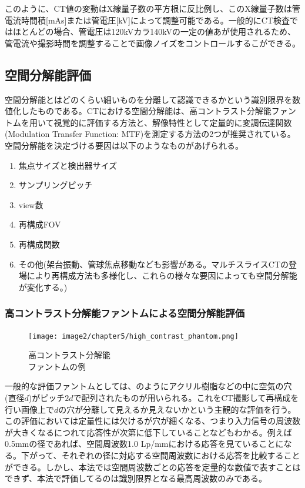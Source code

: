 このように、CT値の変動はX線量子数の平方根に反比例し、このX線量子数は管電流時間積[mAs]または管電圧[kV]によって調整可能である。一般的にCT検査ではほとんどの場合、管電圧は120kVカラ140kVの一定の値あが使用されるため、管電流や撮影時間を調整することで画像ノイズをコントロールするこができる。
\fi


\subsection{空間分解能評価}
空間分解能とはどのくらい細いものを分離して認識できるかという識別限界を数値化したものである。CTにおける空間分解能は、高コントラスト分解能ファントムを用いて視覚的に評価する方法と、解像特性として定量的に変調伝達関数(Modulation Transfer Function: MTF)を測定する方法の2つが推奨されている。空間分解能を決定づける要因は以下のようなものがあげられる。
\begin{enumerate}
\item 焦点サイズと検出器サイズ
\item サンプリングピッチ
\item view数
\item 再構成FOV
\item 再構成関数
\item その他(架台振動、管球焦点移動なども影響がある。マルチスライスCTの登場により再構成方法も多様化し、これらの様々な要因によっても空間分解能が変化する。)
\end{enumerate}

\subsubsection*{高コントラスト分解能ファントムによる空間分解能評価}

\begin{figure}
 \begin{center}
 \texttt{[image: image2/chapter5/high\_contrast\_phantom.png]} 
 \end{center}
 \caption{高コントラスト分解能\\ファントムの例}
 \label{fig:high_contrast_phantom}
\end{figure}
一般的な評価ファントムとしては、のようにアクリル樹脂などの中に空気の穴(直径$d$)がピッチ$2d$で配列されたものが用いられる。これをCT撮影して再構成を行い画像上で$d$の穴が分離して見えるか見えないかという主観的な評価を行う。この評価においては定量性には欠けるが穴が細くなる、つまり入力信号の周波数が大きくなるにつれて応答性が次第に低下していることなどもわかる。例えば0.5mmの径であれば、空間周波数1.0 Lp/mmにおける応答を見ていることになる。下がって、それぞれの径に対応する空間周波数における応答を比較することができる。しかし、本法では空間周波数ごとの応答を定量的な数値で表すことはできず、本法で評価してるのは識別限界となる最高周波数のみである。



